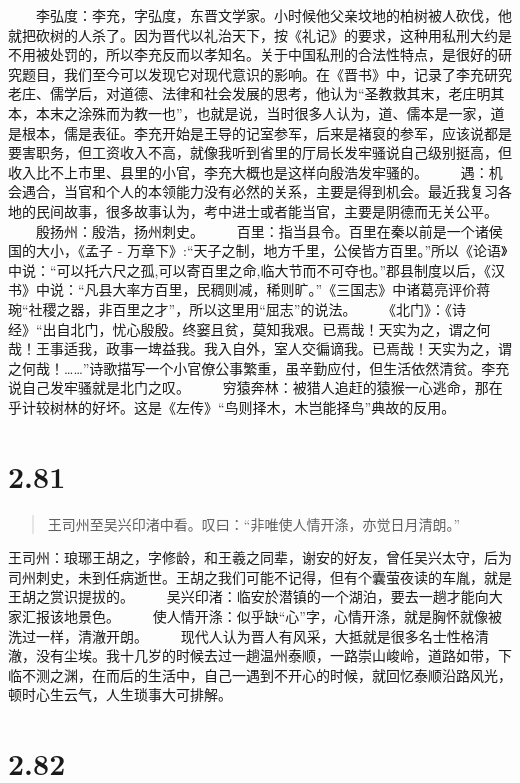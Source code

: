 \documentclass[]{book}
\begin{document}
　　李弘度：李充，字弘度，东晋文学家。小时候他父亲坟地的柏树被人砍伐，他就把砍树的人杀了。因为晋代以礼治天下，按《礼记》的要求，这种用私刑大约是不用被处罚的，所以李充反而以孝知名。关于中国私刑的合法性特点，是很好的研究题目，我们至今可以发现它对现代意识的影响。在《晋书》中，记录了李充研究老庄、儒学后，对道德、法律和社会发展的思考，他认为``圣教救其末，老庄明其本，本末之涂殊而为教一也''，也就是说，当时很多人认为，道、儒本是一家，道是根本，儒是表征。李充开始是王导的记室参军，后来是褚裒的参军，应该说都是要害职务，但工资收入不高，就像我听到省里的厅局长发牢骚说自己级别挺高，但收入比不上市里、县里的小官，李充大概也是这样向殷浩发牢骚的。
　　遇：机会遇合，当官和个人的本领能力没有必然的关系，主要是得到机会。最近我复习各地的民间故事，很多故事认为，考中进士或者能当官，主要是阴德而无关公平。
　　殷扬州：殷浩，扬州刺史。
　　百里：指当县令。百里在秦以前是一个诸侯国的大小，《孟子 -
万章下》:``天子之制，地方千里，公侯皆方百里。''所以《论语》中说：``可以托六尺之孤,可以寄百里之命,临大节而不可夺也。''郡县制度以后，《汉书》中说：``凡县大率方百里，民稠则减，稀则旷。''《三国志》中诸葛亮评价蒋琬``社稷之器，非百里之才''，所以这里用``屈志''的说法。
　　《北门》：《诗经》``出自北门，忧心殷殷。终窭且贫，莫知我艰。已焉哉！天实为之，谓之何哉！王事适我，政事一埤益我。我入自外，室人交徧谪我。已焉哉！天实为之，谓之何哉！\ldots{}\ldots{}''诗歌描写一个小官僚公事繁重，虽辛勤应付，但生活依然清贫。李充说自己发牢骚就是北门之叹。
　　穷猿奔林：被猎人追赶的猿猴一心逃命，那在乎计较树林的好坏。这是《左传》``鸟则择木，木岂能择鸟''典故的反用。

\section{2.81}\label{section-127}

\begin{quote}
王司州至吴兴印渚中看。叹曰：``非唯使人情开涤，亦觉日月清朗。''
\end{quote}

王司州：琅琊王胡之，字修龄，和王羲之同辈，谢安的好友，曾任吴兴太守，后为司州刺史，未到任病逝世。王胡之我们可能不记得，但有个囊萤夜读的车胤，就是王胡之赏识提拔的。
　　吴兴印渚：临安於潜镇的一个湖泊，要去一趟才能向大家汇报该地景色。
　　使人情开涤：似乎缺``心''字，心情开涤，就是胸怀就像被洗过一样，清澈开朗。
　　现代人认为晋人有风采，大抵就是很多名士性格清澈，没有尘埃。我十几岁的时候去过一趟温州泰顺，一路崇山峻岭，道路如带，下临不测之渊，在而后的生活中，自己一遇到不开心的时候，就回忆泰顺沿路风光，顿时心生云气，人生琐事大可排解。

\section{2.82}\label{section-128}
\end{document}
